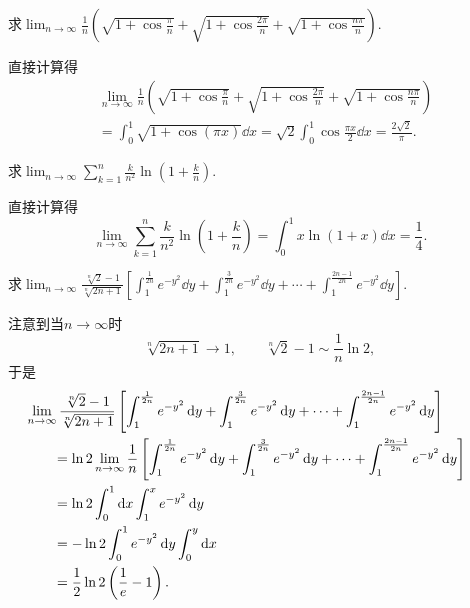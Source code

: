 \begin{example}
求\(\lim_{n\to\infty} \frac1n \left(
	\sqrt{1+\cos\frac\pi{n}}
	+ \sqrt{1+\cos\frac{2\pi}{n}}
	+ \sqrt{1+\cos\frac{n\pi}{n}}
\right)\).
\begin{solution}
直接计算得\begin{align*}
	&\lim_{n\to\infty} \frac1n \left(
		\sqrt{1+\cos\frac\pi{n}}
		+ \sqrt{1+\cos\frac{2\pi}{n}}
		+ \sqrt{1+\cos\frac{n\pi}{n}}
	\right) \\
	&= \int_0^1 \sqrt{1+\cos(\pi x)} \dd{x}
	= \sqrt2 \int_0^1 \cos\frac{\pi x}2 \dd{x}
	= \frac{2\sqrt2}\pi.
\end{align*}
\end{solution}
\end{example}
\begin{example}
求\(\lim_{n\to\infty} \sum_{k=1}^n \frac{k}{n^2} \ln(1+\frac{k}{n})\).
\begin{solution}
直接计算得\begin{equation*}
	\lim_{n\to\infty} \sum_{k=1}^n \frac{k}{n^2} \ln(1+\frac{k}{n})
	= \int_0^1 x \ln(1+x) \dd{x}
	= \frac14.
\end{equation*}
\end{solution}
\end{example}

\begin{example}
求\(\lim_{n\to\infty} \frac{\sqrt[n]{2}-1}{\sqrt[n]{2n+1}}
\left[
	\int_1^{\frac1{2n}} e^{-y^2} \dd{y}
	+ \int_1^{\frac3{2n}} e^{-y^2} \dd{y}
	+ \dotsb + \int_1^{\frac{2n-1}{2n}} e^{-y^2} \dd{y}
\right]\).
\begin{solution}
注意到当\(n\to\infty\)时\[
	\sqrt[n]{2n+1} \to 1,%
	\qquad
	\sqrt[n]{2}-1 \sim \frac1n \ln2,%
\]
于是\begin{align*}
	&\hspace{-20pt}
	\lim_{n\to\infty} \frac{\sqrt[n]{2}-1}{\sqrt[n]{2n+1}}
	\left[
		\int_1^{\frac1{2n}} e^{-y^2} \dd{y}
		+ \int_1^{\frac3{2n}} e^{-y^2} \dd{y}
		+ \dotsb + \int_1^{\frac{2n-1}{2n}} e^{-y^2} \dd{y}
	\right] \\
	&= \ln2 \lim_{n\to\infty} \frac1n
	\left[
		\int_1^{\frac1{2n}} e^{-y^2} \dd{y}
		+ \int_1^{\frac3{2n}} e^{-y^2} \dd{y}
		+ \dotsb + \int_1^{\frac{2n-1}{2n}} e^{-y^2} \dd{y}
	\right] \\
	&= \ln2 \int_0^1 \dd{x} \int_1^x e^{-y^2} \dd{y} \\
	&= -\ln 2 \int_0^1 e^{-y^2} \dd{y} \int_0^y \dd{x} \\
	&= \frac12 \ln2 \left( \frac1e - 1 \right).
\end{align*}
\end{solution}
\end{example}

